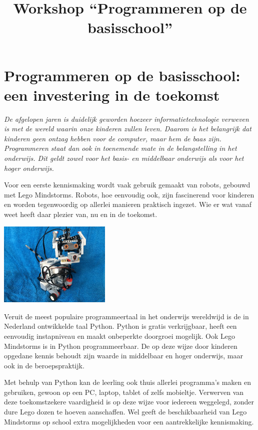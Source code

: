 \documentclass[a4paper,11pt]{article}
\begin{document}
\title{Workshop ``Programmeren op de basisschool''}
\date{}

\maketitle

\section*{Programmeren op de basisschool: een investering in de toekomst}

\emph{De afgelopen jaren is duidelijk geworden hoezeer informatietechnologie verweven is met de wereld waarin onze kinderen zullen leven.
Daarom is het belangrijk dat kinderen geen ontzag hebben voor de computer, maar hem de baas zijn.
Programmeren staat dan ook in toenemende mate in de belangstelling in het onderwijs.
Dit geldt zowel voor het basis- en middelbaar onderwijs als voor het hoger onderwijs.}

Voor een eerste kennismaking wordt vaak gebruik gemaakt van robots, gebouwd met Lego Mindstorms.
Robots, hoe eenvoudig ook, zijn fascinerend voor kinderen en worden tegenwoordig op allerlei manieren praktisch ingezet.
Wie er wat vanaf weet heeft daar plezier van, nu en in de toekomst.

\begin{center}
\includegraphics[width=0.4\textwidth]{tuffy_small}
\end{center}

Veruit de meest populaire programmeertaal in het onderwijs wereldwijd is de in Nederland ontwikkelde taal Python.
Python is gratis verkrijgbaar, heeft een eenvoudig instapniveau en maakt onbeperkte doorgroei mogelijk.
Ook Lego Mindstorms is in Python programmeerbaar.
De op deze wijze door kinderen opgedane kennis behoudt zijn waarde in middelbaar en hoger onderwijs, maar ook in de beroepspraktijk.

Met behulp van Python kan de leerling ook thuis allerlei programma's maken en gebruiken, gewoon op een PC, laptop, tablet of zelfs mobieltje.
Verwerven van deze toekomstzekere vaardigheid is op deze wijze voor iedereen weggelegd, zonder dure Lego dozen te hoeven aanschaffen.
Wel geeft de beschikbaarheid van Lego Mindstorms op school extra mogelijkheden voor een aantrekkelijke kennismaking.
\end{document}
